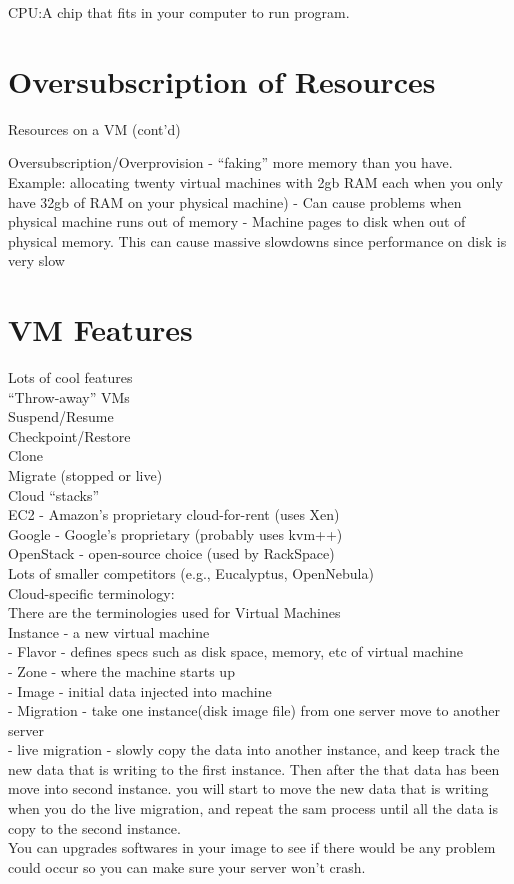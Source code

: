 \documentclass[fancy,11pt,titlestyle=display]{style/elegantbook}
\begin{document}
CPU:A chip that fits in your computer to run program.\\

\section{Oversubscription of Resources}

Resources on a VM (cont'd)

Oversubscription/Overprovision - ``faking'' more memory than you have.
Example: allocating twenty virtual machines with 2gb RAM each when you only have 32gb of RAM on your physical machine)
- Can cause problems when physical machine runs out of memory
- Machine pages to disk when out of physical memory. This can cause massive slowdowns since performance on disk is very slow

\section{VM Features}

Lots of cool features\\
``Throw-away'' VMs\\
Suspend/Resume\\
Checkpoint/Restore\\
Clone\\
Migrate (stopped or live)\\
Cloud ``stacks''\\
EC2 - Amazon's proprietary cloud-for-rent (uses Xen)\\
Google - Google's proprietary (probably uses kvm++)\\
OpenStack - open-source choice (used by RackSpace)\\
Lots of smaller competitors (e.g., Eucalyptus, OpenNebula)\\

Cloud-specific terminology:\\
There are the terminologies used for Virtual Machines\\
Instance - a new virtual machine\\
- Flavor - defines specs such as disk space, memory, etc of virtual machine\\
- Zone - where the machine starts up\\
- Image - initial data injected into machine\\
- Migration - take one instance(disk image file) from one server move to another server\\
- live migration  - slowly copy the data into another instance, and keep track the new data that is writing to the first instance. Then after the that data has been move into second instance. you will start to move the new data that is writing when you do the live migration, and repeat the sam process until all the data is copy to the second instance.\\
You can upgrades softwares in your image to see if there would be any problem could occur so you can make sure your server won't crash.\\
\end{document}
